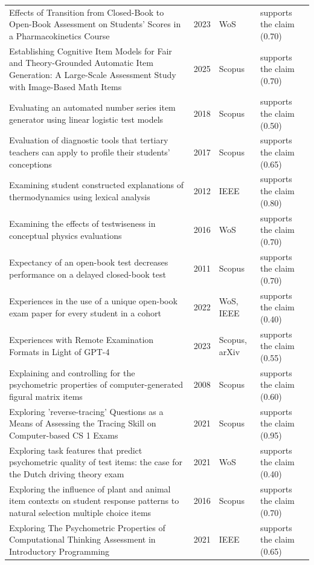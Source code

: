 \begin{longtable}{@{}%
  >{\raggedright\arraybackslash}p{}c%
  >{\raggedright\arraybackslash}p{}%
  >{\raggedright\arraybackslash}p{}@{}}
Effects of Transition from Closed-Book to Open-Book Assessment on Students' Scores in a Pharmacokinetics Course & 2023 & WoS & supports the claim (0.70) \\
Establishing Cognitive Item Models for Fair and Theory-Grounded Automatic Item Generation: A Large-Scale Assessment Study with Image-Based Math Items & 2025 & Scopus & supports the claim (0.70) \\
Evaluating an automated number series item generator using linear logistic test models & 2018 & Scopus & supports the claim (0.50) \\
Evaluation of diagnostic tools that tertiary teachers can apply to profile their students' conceptions & 2017 & Scopus & supports the claim (0.65) \\
Examining student constructed explanations of thermodynamics using lexical analysis & 2012 & IEEE & supports the claim (0.80) \\
Examining the effects of testwiseness in conceptual physics evaluations & 2016 & WoS & supports the claim (0.70) \\
Expectancy of an open-book test decreases performance on a delayed closed-book test & 2011 & Scopus & supports the claim (0.70) \\
Experiences in the use of a unique open-book exam paper for every student in a cohort & 2022 & WoS, IEEE & supports the claim (0.40) \\
Experiences with Remote Examination Formats in Light of GPT-4 & 2023 & Scopus, arXiv & supports the claim (0.55) \\
Explaining and controlling for the psychometric properties of computer-generated figural matrix items & 2008 & Scopus & supports the claim (0.60) \\
Exploring 'reverse-tracing' Questions as a Means of Assessing the Tracing Skill on Computer-based CS 1 Exams & 2021 & Scopus & supports the claim (0.95) \\
Exploring task features that predict psychometric quality of test items: the case for the Dutch driving theory exam & 2021 & WoS & supports the claim (0.40) \\
Exploring the influence of plant and animal item contexts on student response patterns to natural selection multiple choice items & 2016 & Scopus & supports the claim (0.70) \\
Exploring The Psychometric Properties of Computational Thinking Assessment in Introductory Programming & 2021 & IEEE & supports the claim (0.65) \\

\end{longtable}
